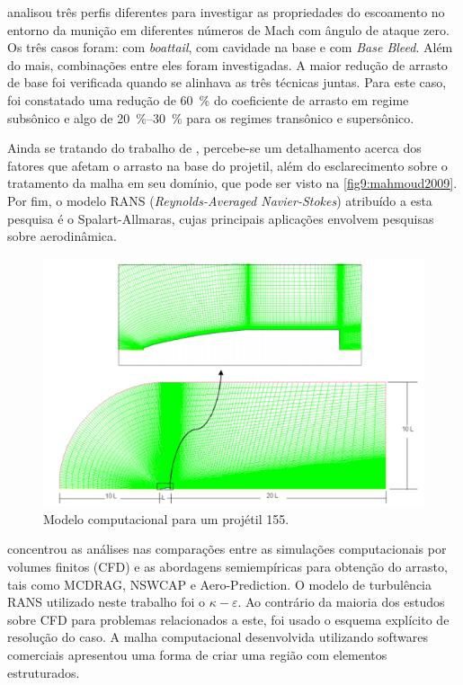\citeauthor{Mahmoud2009} analisou três perfis diferentes para investigar as propriedades do escoamento no entorno da munição em diferentes números de Mach com ângulo de ataque zero. Os três casos foram: com \textit{boattail}, com cavidade na base e com \textit{Base Bleed}. Além do mais, combinações entre eles foram investigadas. A maior redução de arrasto de base foi verificada quando se alinhava as três técnicas juntas. Para este caso, foi constatado uma redução de \qty{60}{\percent} do coeficiente de arrasto em regime subsônico e algo de \qtyrange{20}{30}{\percent} para os regimes transônico e supersônico. 
	
Ainda se tratando do trabalho de \citeauthor{Mahmoud2009}, percebe-se um detalhamento acerca dos fatores que afetam o arrasto na base do projetil, além do esclarecimento sobre o tratamento da malha em seu domínio, que pode ser visto na \autoref{fig9:mahmoud2009}. Por fim, o modelo RANS (\textit{Reynolds-Averaged Navier-Stokes}) atribuído a esta pesquisa é o Spalart-Allmaras, cujas principais aplicações envolvem pesquisas sobre aerodinâmica.  

\begin{figure}[!ht]
	\centering
	\includegraphics[width=1.0\textwidth]{foto09-malha-mahmoud2009.png}
	\caption[Modelo computacional para um projétil \qty{155}{\millimetre}.]{Modelo computacional para um projétil \qty{155}{\millimetre}. \cite{Mahmoud2009}}
	\label{fig9:mahmoud2009}
\end{figure}

\citeauthor{torangatti2basawaraj} concentrou as análises nas comparações entre as simulações computacionais por volumes finitos (CFD) e as abordagens semiempíricas para obtenção do arrasto, tais como MCDRAG, NSWCAP e Aero-Prediction. O modelo de turbulência RANS utilizado neste trabalho foi o \(\kappa-\varepsilon\). Ao contrário da maioria dos estudos sobre CFD para problemas relacionados a este, foi usado o esquema explícito de resolução do caso. A malha computacional desenvolvida utilizando softwares comerciais apresentou uma forma de criar uma região com elementos estruturados.
	
